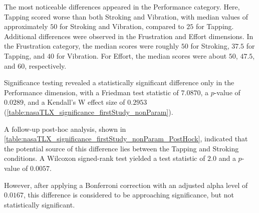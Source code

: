 The most noticeable differences appeared in the Performance category. Here, Tapping scored worse than both Stroking and Vibration, with median values of approximately $50$ for Stroking and Vibration, compared to $25$ for Tapping. Additional differences were observed in the Frustration and Effort dimensions. In the Frustration category, the median scores were roughly $50$ for Stroking, $37.5$ for Tapping, and $40$ for Vibration. For Effort, the median scores were about $50$, $47.5$, and $60$, respectively.

Significance testing revealed a statistically significant difference only in the Performance dimension, with a Friedman test statistic of $7.0870$, a $p$-value of $0.0289$, and a Kendall’s W effect size of $0.2953$ (\autoref{table:nasaTLX_significance_firstStudy_nonParam}).

A follow-up post-hoc analysis, shown in \autoref{table:nasaTLX_significance_firstStudy_nonParam_PostHock}, indicated that the potential source of this difference lies between the Tapping and Stroking conditions. A Wilcoxon signed-rank test yielded a test statistic of $2.0$ and a $p$-value of $0.0057$.

However, after applying a Bonferroni correction with an adjusted alpha level of $0.0167$, this difference is considered to be approaching significance, but not statistically significant.



\begin{table}[ht]
\caption{Results of the Friedman significance tests for the different NasaTLX dimensions with a Kendall's W Effect Size.}
\label{table:nasaTLX_significance_firstStudy_nonParam}
\end{table}


